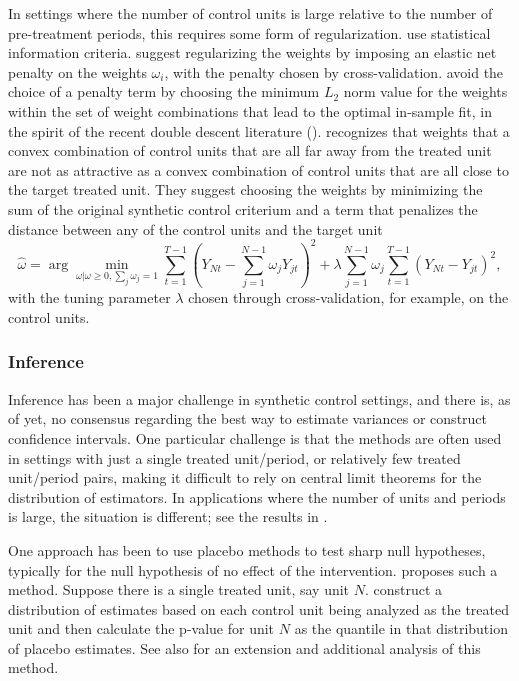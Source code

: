 \documentclass[letterpaper,12pt,leqno]{article}
\begin{document}
In settings where the number of control units is large relative to the number of pre-treatment periods, this requires some form of regularization. \citep{hsiao2012panel} use statistical information criteria.
\citep{doudchenko2016balancing} suggest regularizing the weights by imposing  an elastic net penalty on the weights $\omega_i$, with the penalty chosen by cross-validation.
\citep{spiess2023double} avoid the choice of a penalty term by  choosing the minimum $L_2$ norm value for the weights within the set of weight combinations that lead to the optimal in-sample fit, in the spirit of the recent double descent literature (\citealp{belkin2019reconciling}).
\citep{abadie2021penalized} recognizes that weights that a convex combination of control units that are all far away from the treated unit are not as attractive as a convex combination of control units that are all close to the target treated unit. They suggest choosing the weights by minimizing the sum of the original synthetic control criterium and a term that penalizes the distance between any of the control units and the target unit
\[\hat\omega=\arg\min_{\omega|\omega\geq 0,\sum_j\omega_j=1}\sum_{t=1}^{T-1} \left(Y_{Nt}-\sum_{j=1}^{N-1} \omega_j Y_{jt}\right)^2+\lambda\sum_{j=1}^{N-1} \omega_j \sum_{t=1}^{T-1} (Y_{Nt}-Y_{jt})^2,
\]
with the tuning parameter $\lambda$ chosen through cross-validation, for example, on the control units.




\subsubsection{Inference}

Inference has been a major challenge in synthetic control settings, and there is, as of yet, no consensus regarding the best way to estimate variances or construct confidence intervals. One particular challenge is that the methods are often used in settings with just a single treated unit/period, or relatively few treated unit/period pairs, making it difficult to rely on central limit theorems for the distribution of estimators. In applications where the number of units and periods is large, the situation is different; see the results in \cite{arkhangelsky2021synthetic, ferman2021properties}.

One approach has been to use placebo methods to test sharp null hypotheses, typically for the null hypothesis of no effect of the intervention.
\citep*{abadie2010synthetic} proposes such a method.
Suppose there is a single treated unit, say unit $N$. 
\citep*{abadie2010synthetic} construct a distribution of estimates based on each control unit being analyzed as the treated unit and then calculate the p-value for unit $N$ as the quantile in that distribution of placebo estimates. See also \cite{firpo2018synthetic} for an extension and additional analysis of this method.
\end{document}
